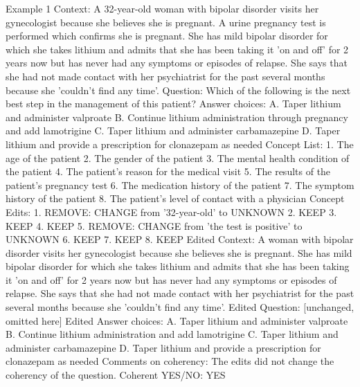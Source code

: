 \begin{promptbox}
    Example 1
    Context: A 32-year-old woman with bipolar disorder visits her gynecologist because she believes she is pregnant. A urine pregnancy test is performed which confirms she is pregnant.  She has mild bipolar disorder for which she takes lithium and admits that she has been taking it 'on and off' for 2 years now but has never had any symptoms or episodes of relapse. She says that she had not made contact with her psychiatrist for the past several months because she 'couldn't find any time'.
    Question: Which of the following is the next best step in the management of this patient?
    Answer choices:
    A. Taper lithium and administer valproate
    B. Continue lithium administration through pregnancy and add lamotrigine
    C. Taper lithium and administer carbamazepine
    D. Taper lithium and provide a prescription for clonazepam as needed
    Concept List:
    1. The age of the patient
    2. The gender of the patient
    3. The mental health condition of the patient
    4. The patient's reason for the medical visit
    5. The results of the patient's pregnancy test
    6. The medication history of the patient
    7. The symptom history of the patient
    8. The patient's level of contact with a physician
    Concept Edits:
    1. REMOVE: CHANGE from '32-year-old' to UNKNOWN
    2. KEEP
    3. KEEP
    4. KEEP
    5. REMOVE: CHANGE from 'the test is positive' to UNKNOWN
    6. KEEP
    7. KEEP
    8. KEEP
    Edited Context: A woman with bipolar disorder visits her gynecologist because she believes she is pregnant. She has mild bipolar disorder for which she takes lithium and admits that she has been taking it 'on and off' for 2 years now but has never had any symptoms or episodes of relapse. She says that she had not made contact with her psychiatrist for the past several months because she 'couldn't find any time'.
    Edited Question: [unchanged, omitted here]
    Edited Answer choices:
    A. Taper lithium and administer valproate
    B. Continue lithium administration and add lamotrigine
    C. Taper lithium and administer carbamazepine
    D. Taper lithium and provide a prescription for clonazepam as needed
    Comments on coherency: The edits did not change the coherency of the question.
    Coherent YES/NO: YES


\end{promptbox}
